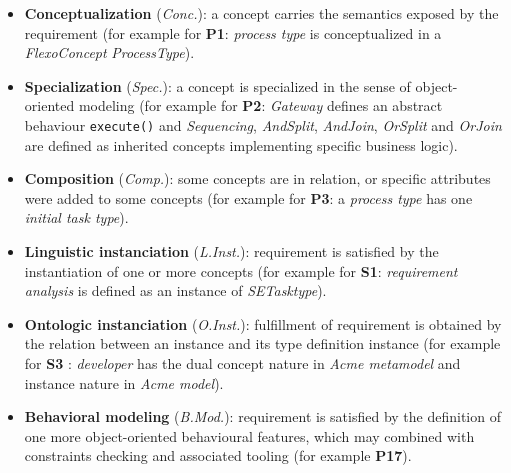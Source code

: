 \begin{itemize}
    \item \textbf{Conceptualization} (\textit{Conc.}): a concept carries the semantics exposed by the requirement (for example for \textbf{P1}: \textit{process type} is conceptualized in a \textit{FlexoConcept} \textit{ProcessType}).
    \item \textbf{Specialization} (\textit{Spec.}): a concept is specialized in the sense of object-oriented modeling (for example for \textbf{P2}: \textit{Gateway} defines an abstract behaviour \texttt{execute()} and \textit{Sequencing}, \textit{AndSplit}, \textit{AndJoin}, \textit{OrSplit} and \textit{OrJoin} are defined as inherited concepts implementing specific business logic).
    \item \textbf{Composition} (\textit{Comp.}): some concepts are in relation, or specific attributes were added to some concepts (for example for \textbf{P3}: a \textit{process type} has one \textit{initial task type}).
    \item \textbf{Linguistic instanciation} (\textit{L.Inst.}): requirement is satisfied by the instantiation of one or more concepts (for example for \textbf{S1}: \textit{requirement analysis} is defined as an instance of \textit{SETasktype}).
    \item \textbf{Ontologic instanciation} (\textit{O.Inst.}): fulfillment of requirement is obtained by the relation between an instance and its type definition instance (for example for \textbf{S3} : \textit{developer} has the dual concept nature in \textit{Acme metamodel} and instance nature in \textit{Acme model}).
    \item \textbf{Behavioral modeling} (\textit{B.Mod.}): requirement is satisfied by the definition of one more object-oriented behavioural features, which may combined with constraints checking and associated tooling (for example \textbf{P17}).
\end{itemize}




